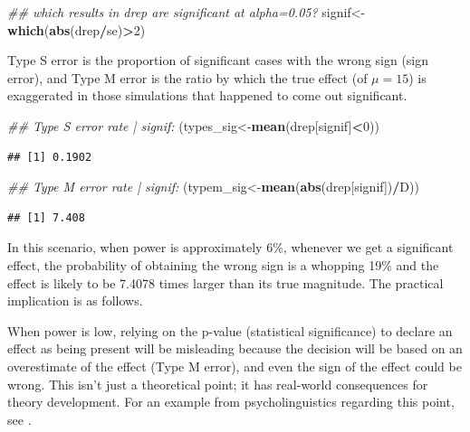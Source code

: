\documentclass[12pt,]{krantz}
\newenvironment{Shaded}{\begin{snugshade}}{\end{snugshade}}
\newcommand{\CommentTok}[1]{\textcolor[rgb]{0.56,0.35,0.01}{\textit{#1}}}
\newcommand{\DecValTok}[1]{\textcolor[rgb]{0.00,0.00,0.81}{#1}}
\newcommand{\KeywordTok}[1]{\textcolor[rgb]{0.13,0.29,0.53}{\textbf{#1}}}
\newcommand{\NormalTok}[1]{#1}
\newcommand{\OperatorTok}[1]{\textcolor[rgb]{0.81,0.36,0.00}{\textbf{#1}}}
\begin{document}
\begin{Shaded}
\begin{Highlighting}[]
\CommentTok{## which results in drep are significant at alpha=0.05?}
\NormalTok{signif<-}\KeywordTok{which}\NormalTok{(}\KeywordTok{abs}\NormalTok{(drep}\OperatorTok{/}\NormalTok{se)}\OperatorTok{>}\DecValTok{2}\NormalTok{)}
\end{Highlighting}
\end{Shaded}

Type S error is the proportion of significant cases with the wrong sign (sign error), and Type M error is the ratio by which the true effect (of \(\mu=15\)) is exaggerated in those simulations that happened to come out significant.

\begin{Shaded}
\begin{Highlighting}[]
\CommentTok{## Type S error rate | signif:}
\NormalTok{(types_sig<-}\KeywordTok{mean}\NormalTok{(drep[signif]}\OperatorTok{<}\DecValTok{0}\NormalTok{))}
\end{Highlighting}
\end{Shaded}

\begin{verbatim}
## [1] 0.1902
\end{verbatim}

\begin{Shaded}
\begin{Highlighting}[]
\CommentTok{## Type M error rate | signif: }
\NormalTok{(typem_sig<-}\KeywordTok{mean}\NormalTok{(}\KeywordTok{abs}\NormalTok{(drep[signif])}\OperatorTok{/}\NormalTok{D))}
\end{Highlighting}
\end{Shaded}

\begin{verbatim}
## [1] 7.408
\end{verbatim}

In this scenario, when power is approximately 6\%, whenever we get a significant effect, the probability of obtaining the wrong sign is a whopping 19\% and the effect is likely to be 7.4078 times larger than its true magnitude. The practical implication is as follows.

When power is low, relying on the p-value (statistical significance) to declare an effect as being present will be misleading because the decision will be based on an overestimate of the effect (Type M error), and even the sign of the effect could be wrong. This isn't just a theoretical point; it has real-world consequences for theory development. For an example from psycholinguistics regarding this point, see \citet{VasishthMertzenJaegerGelman2018}.
\end{document}
